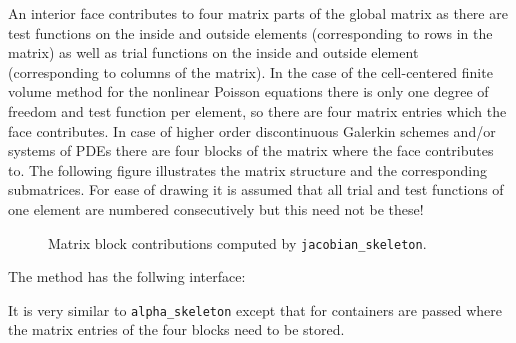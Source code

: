 \documentclass[a4paper,12pt]{article}
\begin{document}
An interior face contributes to four matrix parts of the global matrix as there
are test functions on the inside and outside elements (corresponding to rows in the
matrix) as well as trial functions on the inside and outside element (corresponding to
columns of the matrix). In the case of the cell-centered finite volume method for
the nonlinear Poisson equations there is only one degree of freedom and test function per
element, so there are four matrix entries which the face contributes. In case of higher 
order discontinuous Galerkin schemes and/or systems of PDEs there are four blocks 
of the matrix where the face contributes to. The following figure illustrates 
the matrix structure and the corresponding submatrices. For ease of drawing it is
assumed that all trial and test functions of one element are numbered consecutively
but this need not be these!
\begin{figure}[h]
\begin{center}
\hspace{0.1\textwidth}
\end{center}
\caption{Matrix block contributions computed by \lstinline{jacobian_skeleton}.}
\label{fig:MatrixBlocks}
\end{figure}

The method has the follwing interface:

It is very similar to \lstinline{alpha_skeleton} except that for containers
are passed where the matrix entries of the four blocks need to be stored.
\end{document}
